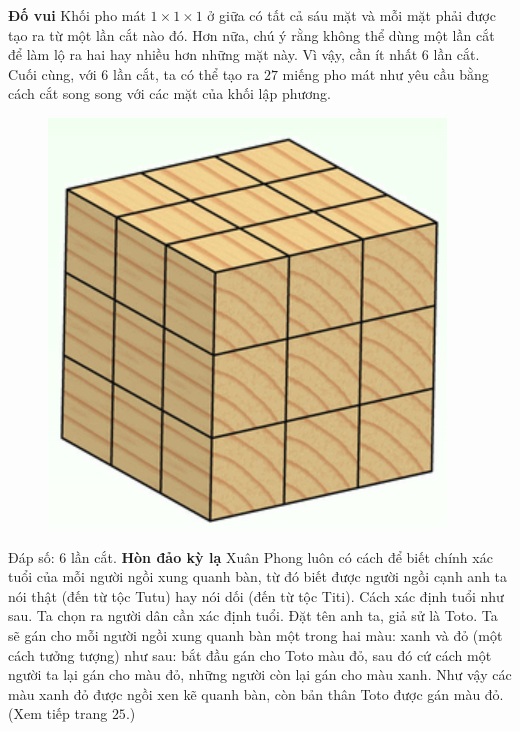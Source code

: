 \begin{multicols}{2}
	\textbf{\color{cackithi}Đố vui}
	\vskip 0.1cm
	Khối pho mát $1\times1\times1$ ở giữa có tất cả sáu mặt và mỗi mặt phải được tạo ra từ một lần cắt nào đó. Hơn nữa, chú ý rằng không thể dùng một lần cắt để làm lộ ra hai hay nhiều hơn những mặt này. Vì vậy, cần ít nhất $6$ lần cắt. Cuối cùng, với  $6$ lần cắt, ta có thể tạo ra $27$ miếng pho mát như yêu cầu bằng cách cắt song song với các mặt của khối lập phương. 
	\begin{figure}[H]
		\vspace*{-5pt}
		\centering
		\captionsetup{labelformat= empty, justification=centering}
		\includegraphics[width= 0.4\linewidth]{1}
		\vspace*{-10pt}
	\end{figure}
	Đáp số: $6$ lần cắt.
	\vskip 0.1cm
	\textbf{\color{cackithi}Hòn đảo kỳ lạ}
	\vskip 0.1cm 
	Xuân Phong luôn có cách để biết chính xác tuổi của mỗi người ngồi xung quanh bàn, từ đó biết được người ngồi cạnh anh ta nói thật (đến từ tộc Tutu) hay nói dối (đến từ tộc Titi). Cách xác định tuổi như sau.
	\vskip 0.1cm
	Ta chọn ra người dân cần xác định tuổi. Đặt tên anh ta, giả sử là Toto. Ta sẽ gán cho mỗi người ngồi xung quanh bàn một trong hai màu: xanh và đỏ (một cách tưởng tượng) như sau: bắt đầu gán cho Toto màu đỏ, sau đó cứ cách một người ta lại gán cho màu đỏ, những người còn lại gán cho màu xanh. Như vậy các màu xanh đỏ được ngồi xen kẽ quanh bàn, còn bản thân Toto được gán màu đỏ. 
	\vskip 0.1cm
	\hfill (Xem tiếp trang $25$.)
\end{multicols}